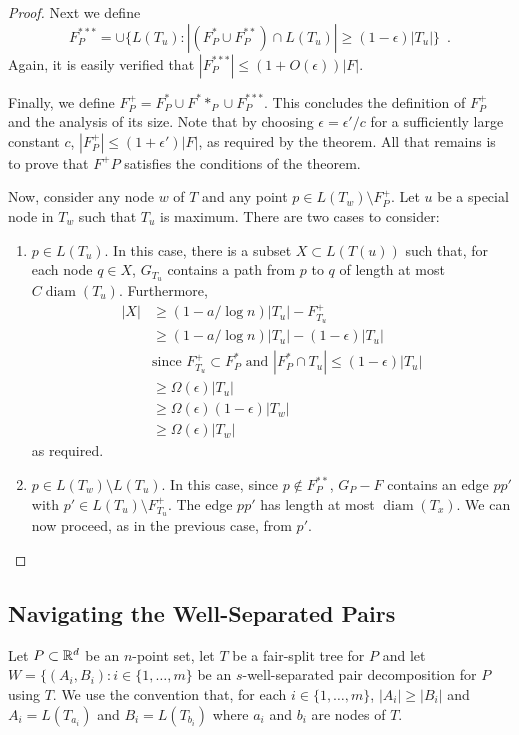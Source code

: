 \documentclass{patmorin}
\DeclareMathOperator{\diam}{diam}
\begin{document}
\begin{proof}
  Next we define 
  \[  F^{***}_P = \cup\{L(T_u) : |(F^*_P\cup F^{**}_P)\cap L(T_u)| \ge (1-\epsilon)|T_u|\} \enspace . \]
  Again, it is easily verified that $|F^{***}_P| \le (1+O(\epsilon))|F|$.

  Finally, we define $F^+_P= F^*_P\cup F^**_P\cup F^{***}_P$.   This
  concludes the definition of $F^+_P$ and the analysis of its size.
  Note that by choosing $\epsilon = \epsilon' /c$ for a sufficiently large
  constant $c$, $|F^+_P|\le (1+\epsilon')|F|$, as required by the theorem.
  All that remains is to prove that $F^+P$ satisfies the conditions of
  the theorem.  

  Now, consider any node $w$ of $T$ and any point $p\in L(T_w)\setminus F^+_P$.
  Let $u$ be a special node in $T_w$ such that $T_u$ is maximum.
  There are two cases to consider:
  \begin{enumerate}
    \item $p\in L(T_u)$. In this case, there is a subset $X\subset L(T(u))$
     such that, for each node $q\in X$, $G_{T_u}$ contains a path from
     $p$ to $q$ of length at most $C\diam(T_u)$. Furthermore,
    \begin{align*}
	    |X| & \ge (1-a/\log n)|T_u| - F^+_{T_u} \\
	        & \ge (1-a/\log n)|T_u| - (1-\epsilon)|T_u| \\
	       & \text{since $F^+_{T_u} \subset F^*_P$ and $|F^*_P\cap T_u|\le (1-\epsilon)|T_u|$} \\
		& \ge \Omega(\epsilon)|T_u| \\ 
		& \ge \Omega(\epsilon)(1-\epsilon)|T_w|  \\
		& \ge \Omega(\epsilon)|T_w| 
    \end{align*}
    as required.
    \item $p\in L(T_w)\setminus L(T_u)$.  In this case, since $p\not\in
    F^{**}_P$, $G_P-F$ contains an edge $pp'$ with $p'\in L(T_u)\setminus
    F^{+}_{T_u}$.  The edge $pp'$ has length at most $\diam(T_x)$.
    We can now proceed, as in the previous case, from $p'$.
  \end{enumerate}
\end{proof}


\subsection{Navigating the Well-Separated Pairs}

Let $P\subset\mathbb{R}^d$ be an $n$-point set, let $T$ be a fair-split tree for
$P$ and let $W=\{(A_i,B_i):i\in\{1,\ldots,m\}$ be an $s$-well-separated
pair decomposition for $P$ using $T$. We use the convention that,
for each $i\in\{1,\ldots,m\}$, $|A_i|\ge |B_i|$ and $A_i=L(T_{a_i})$
and $B_i=L(T_{b_i})$ where $a_i$ and $b_i$ are nodes of $T$.
\end{document}
